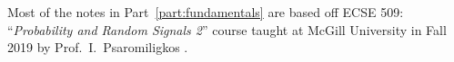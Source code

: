 Most of the notes in Part~\ref{part:fundamentals} are based off ECSE 509: ``\emph{Probability and Random Signals 2}'' course taught at McGill University in Fall 2019 by Prof.~I.~Psaromiligkos \cite{psaromiligkos_slides_2019}.